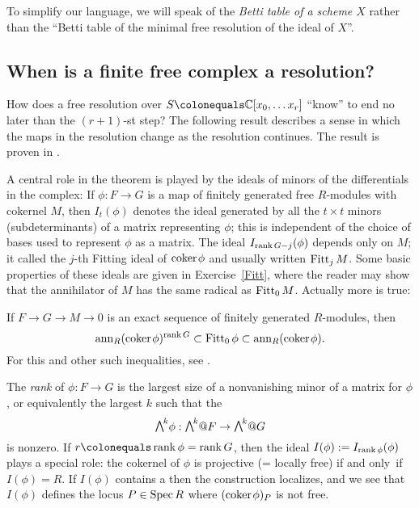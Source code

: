To simplify our language, we will speak of the \emph{Betti table of a
scheme $X$} rather than the ``Betti table of the minimal free resolution
of the ideal of $X$''.

\subsection*{When is a finite free complex a resolution?}
How does a free resolution over $S \colonequals  \CC[x_0, \dots x_r]$
``know'' to end no later than the $(r+1)$-st step?
The following result describes a sense in which the maps in the resolution
change as the resolution continues.
The result is proven in \cite[Theorem 20.9]{Eisenbud1995}.

A central role in the theorem is played by the ideals of minors of the
differentials in the complex: If $\phi: F\to G$ is a map of finitely
generated free $R$-modules with cokernel $M$, then
$I_t(\phi)$ denotes the ideal generated by all the $t\times t$ minors
(subdeterminants) of a matrix representing $\phi$; this is independent
of the choice of bases used to represent $\phi$ as a matrix.
The ideal $I_{\operatorname{rank} G -j}(\phi)$ depends only on $M$; it called the
$j$-th Fitting ideal of ${\rm{coker}\kern1pt} \phi$  and
usually written $\operatorname{Fitt}_{j} M$. Some basic properties of these ideals are
given in Exercise~\ref{Fitt}, where the reader may show that the
annihilator of $M$ has the
same radical as $\operatorname{Fitt}_{0} M$. Actually more is true:

\begin{fact}
If $F\to G \to M \to 0$ is an exact sequence of finitely generated
$R$-modules, then
$$
{\rm{ann}}_{R}({\rm{coker}\kern1pt} \phi)^{\operatorname{rank} G}\subset \operatorname{Fitt}_{0}\phi \subset
{\rm{ann}}_{R}({\rm{coker}\kern1pt} \phi).
$$
For this and other such inequalities, see \cite{MR476736}.
\end{fact}

The \emph{rank} of $\phi: F\to G$ is the largest size of a nonvanishing
%
minor of a matrix for $\phi$,
or equivalently the largest $k$ such that the
%
$$\mwedge^{k}\phi : \mwedge^{k}@F \to \mwedge^{k}@G$$
is nonzero. If $r\colonequals  \rank \phi = \rank G$, then the ideal
$I(\phi): = I_{\operatorname{rank} \phi}(\phi)$ plays a special role: the cokernel
of $\phi$
is projective (= locally free) if and only~if $I(\phi) = R$. If $I(\phi)$
contains a
%
then
the construction localizes, and we see that $I(\phi)$ defines the locus
$P\in \operatorname{Spec} R$ where $({\rm{coker}\kern1pt} \phi)_{P}$
is not free.

